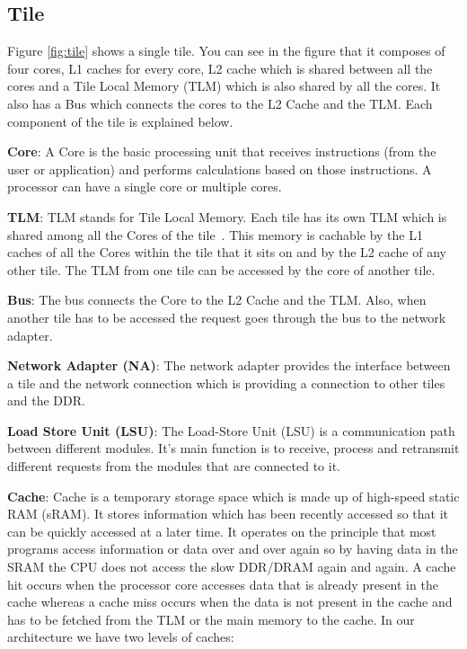 \documentclass{listhesis}
\begin{document}
\subsection{Tile}
Figure \ref{fig:tile} shows a single tile. You can see in the figure that it composes of four cores, L1 caches for every core, L2 cache which is shared between all the cores and a Tile Local Memory (TLM) which is also shared by all the cores. It also has a Bus which connects the cores to the L2 Cache and the TLM. Each component of the tile is explained below.
\par
\textbf{Core}: A Core is the basic processing unit that receives instructions (from the user or application) and performs calculations based on those instructions. A processor can have a single core or multiple cores.  
\par
\textbf{TLM}: TLM stands for Tile Local Memory. Each tile has its own TLM which is shared among all the Cores of the tile~\cite{ankitThesis, iNetworkAdapter}. This memory is cachable by the L1 caches of all the Cores within the tile that it sits on and by the L2 cache of any other tile. The TLM from one tile can be accessed by the core of another tile.
\par
\textbf{Bus}: The bus connects the Core to the L2 Cache and the TLM. Also, when another tile has to be accessed the request goes through the bus to the network adapter.
\par
\textbf{Network Adapter (NA)}: The network adapter provides the interface between a tile and the network connection which is providing a connection to other tiles and the DDR.
\par
\textbf{Load Store Unit (LSU)}: The Load-Store Unit (LSU) is a communication path between different modules. It's main function is to receive, process and retransmit different requests from the modules that are connected to it.
\par
\textbf{Cache}: Cache is a temporary storage space which is made up of high-speed static RAM (sRAM). It stores information which has been recently accessed so that it can be quickly accessed at a later time. It operates on the principle that most programs access information or data over and over again so by having data in the SRAM the CPU does not access the slow DDR/DRAM again and again. A cache hit occurs when the processor core accesses data that is already present in the cache whereas a cache miss occurs when the data is not present in the cache and has to be fetched from the TLM or the main memory to the cache. In our architecture we have two levels of caches:
\end{document}
